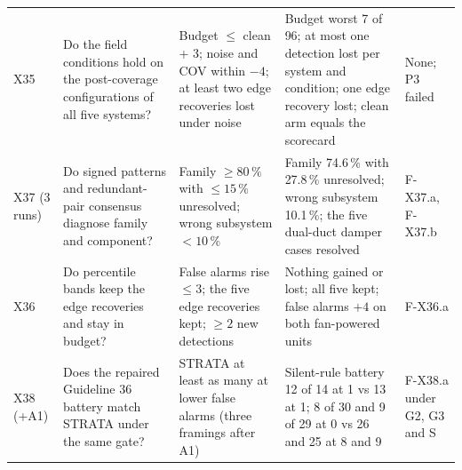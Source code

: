 \documentclass[11pt,letterpaper]{article}
\begin{document}
{\begin{longtable}{@{}>{\raggedright\arraybackslash}p{0.9cm}>{\raggedright\arraybackslash}p{4.3cm}>{\raggedright\arraybackslash}p{3.2cm}>{\raggedright\arraybackslash}p{4.2cm}>{\raggedright\arraybackslash}p{2.4cm}@{}}
X35 & Do the field conditions hold on the post-coverage configurations of all five systems? & Budget $\le$ clean + 3; noise and COV within $-4$; at least two edge recoveries lost under noise & Budget worst 7 of 96; at most one detection lost per system and condition; one edge recovery lost; clean arm equals the scorecard & None; P3 failed \\
X37 (3 runs) & Do signed patterns and redundant-pair consensus diagnose family and component? & Family $\ge 80\,\%$ with $\le 15\,\%$ unresolved; wrong subsystem $< 10\,\%$ & Family 74.6\,\% with 27.8\,\% unresolved; wrong subsystem 10.1\,\%; the five dual-duct damper cases resolved & F-X37.a, F-X37.b \\
X36 & Do percentile bands keep the edge recoveries and stay in budget? & False alarms rise $\le 3$; the five edge recoveries kept; $\ge 2$ new detections & Nothing gained or lost; all five kept; false alarms $+4$ on both fan-powered units & F-X36.a \\
X38 (+A1) & Does the repaired Guideline 36 battery match STRATA under the same gate? & STRATA at least as many at lower false alarms (three framings after A1) & Silent-rule battery 12 of 14 at 1 vs 13 at 1; 8 of 30 and 9 of 29 at 0 vs 26 and 25 at 8 and 9 & F-X38.a under G2, G3 and S \\
\hline
\end{longtable}}



\end{document}

